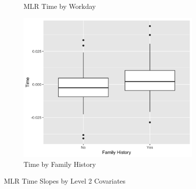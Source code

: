 \documentclass[12pt,twoside,leqno,fleqn,letterpaper]{article}
\theoremstyle{definition}
\theoremstyle{definition}
\begin{document}
\begin{figure}
\begin{subfigure}[b]{0.32\textwidth}
        \caption[]%
        {{\small MLR Time by Workday}}
        \label{fig: time v day}
        \end{subfigure}
        \hfill
        \begin{subfigure}[b]{0.32\textwidth}
        \centering
        \includegraphics[width=\textwidth]{pics/mlr time by fh.png}
        \caption[]%
        {{\small Time by Family History}}
        \label{fig: time v fh}
        \end{subfigure}
        \caption[]
        {\small MLR Time Slopes by Level 2 Covariates}
        \label{fig: time v lv2}
        \end{figure}
    
\end{document}
